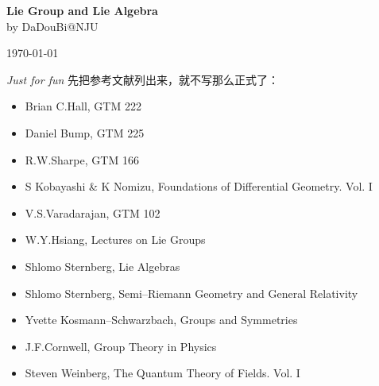 \documentclass[9pt]{extbook}
\theoremstyle{plain}
\begin{document}
\frontmatter
\thispagestyle{empty}
\begin{flushright}
{\Huge\bfseries Lie Group and Lie Algebra}\\[\baselineskip]
{by DaDouBi@NJU}\par
\today
\end{flushright}
\vfill
{\Large\itshape Just for fun}
\clearpage
先把参考文献列出来，就不写那么正式了：
\begin{itemize}

\item Brian C.Hall, GTM 222

\item Daniel Bump, GTM 225

\item R.W.Sharpe, GTM 166

\item S Kobayashi \& K Nomizu, Foundations of Differential Geometry. Vol. I

\item V.S.Varadarajan, GTM 102

\item W.Y.Hsiang, Lectures on Lie Groups

\item Shlomo Sternberg, Lie Algebras

\item Shlomo Sternberg, Semi--Riemann Geometry and General Relativity

\item Yvette Kosmann--Schwarzbach, Groups and Symmetries

\item J.F.Cornwell, Group Theory in Physics

\item Steven Weinberg, The Quantum Theory of Fields. Vol. I

\end{itemize}
\mainmatter
\end{document}
